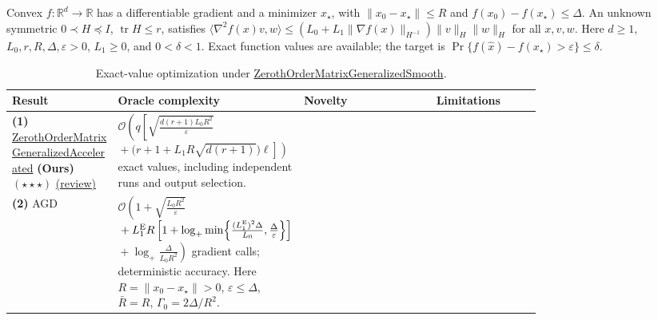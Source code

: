 \begin{table}[tp]
\centering
\caption{Exact-value optimization under \href{https://github.com/k3nfalt/longtails/blob/main/LongTails/Setups/ZerothOrderMatrixGeneralizedSmooth.lean}{ZerothOrderMatrixGeneralizedSmooth}.}\label{tab:ZerothOrderMatrixGeneralizedSmooth}
\parbox{\linewidth}{\footnotesize Convex $f:\mathbb R^d\to\mathbb R$ has a differentiable gradient and a minimizer $x_\star$, with $\|x_0-x_\star\|\le R$ and $f(x_0)-f(x_\star)\le\Delta$. An unknown symmetric $0\prec H\preceq I$, $\operatorname{tr}H\le r$, satisfies $\langle\nabla^2 f(x)v,w\rangle\le (L_0+L_1\|\nabla f(x)\|_{H^{-1}})\|v\|_H\|w\|_H$ for all $x,v,w$. Here $d\ge1$, $L_0,r,R,\Delta,\varepsilon>0$, $L_1\ge0$, and $0<\delta<1$. Exact function values are available; the target is $\Pr\{f(\widehat x)-f(x_\star)>\varepsilon\}\le\delta$.}\par\smallskip
\begin{threeparttable}
\footnotesize
\setlength{\tabcolsep}{4pt}\renewcommand{\arraystretch}{1.25}
\begin{tabularx}{\linewidth}{@{}>{\raggedright\arraybackslash}p{0.20\linewidth}>{\raggedright\arraybackslash}p{0.32\linewidth}>{\raggedright\arraybackslash}p{0.25\linewidth}>{\raggedright\arraybackslash}X@{}}
\toprule
\textbf{Result} & \textbf{Oracle complexity} & \textbf{Novelty} & \textbf{Limitations} \\
\midrule
\textbf{(1)} \href{https://github.com/k3nfalt/longtails/blob/main/LongTails/Theorems/ZerothOrderMatrixGeneralizedAccelerated.lean}{Zeroth\allowbreak Order\allowbreak Matrix\allowbreak Generalized\allowbreak Accelerated} \textbf{(Ours)} $(\star\star\star)$ \href{https://github.com/k3nfalt/longtails/blob/main/scripts/reviews/ZerothOrderMatrixGeneralizedAccelerated.md}{(review)}
& $\mathcal{O}\!\left(q\left[\sqrt{\frac{d(r+1)L_0R^2}{\varepsilon}}\right.\right.$\newline
$\left.\left.{}+\bigl(r+1+L_1R\sqrt{d(r+1)}\bigr)\ell\right]\right)$ exact values, including independent runs and output selection.
& & \\
\midrule[1.2pt]
\textbf{(2)} AGD \citep[Thm.~4.3]{Tyurin2026v2CompositeTable}
& $\mathcal{O}\!\left(1+\sqrt{\frac{L_0R^2}{\varepsilon}}\right.$\newline
${}+L_1^{\rm E}R\left[1+\log_+\min\!\left\{\frac{(L_1^{\rm E})^2\Delta}{L_0},\frac{\Delta}{\varepsilon}\right\}\right]$\newline
$\left.{}+\log_+\frac{\Delta}{L_0R^2}\right)$ gradient calls; deterministic accuracy. Here $R=\|x_0-x_\star\|>0$, $\varepsilon\le\Delta$, $\bar R=R$, $\Gamma_0=2\Delta/R^2$.

\end{tabularx}
\end{threeparttable}
\end{table}
